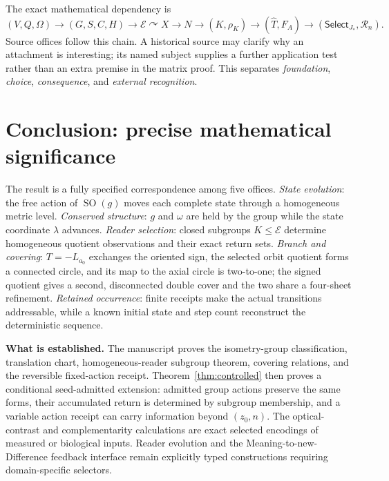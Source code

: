 \documentclass[10pt,letterpaper]{article}
\theoremstyle{definition}\newtheorem{definition}[theorem]{Definition}
\newcommand{\SO}{\operatorname{SO}}
\begin{document}
The exact mathematical dependency is
\begin{equation}\label{eq:dep}
 \boxed{(V,Q,\Omega)\longrightarrow(G,S,C,H)\longrightarrow\mathcal E\curvearrowright X
 \longrightarrow N\longrightarrow (K,\rho_K)
 \longrightarrow (\widehat T,F_A)\longrightarrow(\mathsf{Select}_{J_*},\mathcal R_n).}
\end{equation}
Source offices follow this chain. A historical source may clarify why an attachment is interesting; its named subject supplies a further application test rather than an extra premise in the matrix proof. This separates \emph{foundation}, \emph{choice}, \emph{consequence}, and \emph{external recognition}.

\section{Conclusion: precise mathematical significance}
The result is a fully specified correspondence among five offices. \emph{State evolution}: the free action of $\SO(g)$ moves each complete state through a homogeneous metric level. \emph{Conserved structure}: $g$ and $\omega$ are held by the group while the state coordinate $\lambda$ advances. \emph{Reader selection}: closed subgroups $K\leq\mathcal E$ determine homogeneous quotient observations and their exact return sets. \emph{Branch and covering}: $T=-L_{a_0}$ exchanges the oriented sign, the selected orbit quotient forms a connected circle, and its map to the axial circle is two-to-one; the signed quotient gives a second, disconnected double cover and the two share a four-sheet refinement. \emph{Retained occurrence}: finite receipts make the actual transitions addressable, while a known initial state and step count reconstruct the deterministic sequence.

\textbf{What is established.} The manuscript proves the isometry-group classification, translation chart, homogeneous-reader subgroup theorem, covering relations, and the reversible fixed-action receipt. Theorem~\ref{thm:controlled} then proves a conditional seed-admitted extension: admitted group actions preserve the same forms, their accumulated return is determined by subgroup membership, and a variable action receipt can carry information beyond $(z_0,n)$. The optical-contrast and complementarity calculations are exact selected encodings of measured or biological inputs. Reader evolution and the Meaning-to-new-Difference feedback interface remain explicitly typed constructions requiring domain-specific selectors.
\end{document}
